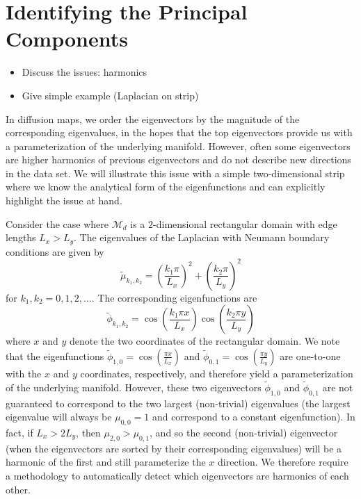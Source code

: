 \documentclass[preprint]{elsarticle}
\begin{document}
\section{Identifying the Principal Components}

\begin{itemize}
\item Discuss the issues: harmonics
\item Give simple example (Laplacian on strip)
\end{itemize}


In diffusion maps, we order the eigenvectors by the magnitude of the corresponding eigenvalues, in the hopes that the top eigenvectors provide us with a parameterization of the underlying manifold.
%
However, often some eigenvectors are higher harmonics of previous eigenvectors and do not describe new directions in the data set. 
%
We will illustrate this issue with a simple two-dimensional strip where we know the analytical form of the eigenfunctions and can explicitly highlight the issue at hand. 

Consider the case where $\mathcal{M}_d$ is a $2$-dimensional rectangular domain with edge lengths $L_x  > L_y$. 
%
The eigenvalues of the Laplacian with Neumann boundary conditions are given by
\begin{equation}
\tilde{\mu}_{k_1, k_2} = \left( \frac{k_1 \pi}{L_x} \right)^2 + \left( \frac{k_2 \pi}{L_y} \right)^2
\end{equation}
for $k_1, k_2 = 0, 1, 2, \dots$.
%
The corresponding eigenfunctions are 
\begin{equation}
\tilde{\phi}_{k_1, k_2} = \cos \left( \frac{k_1 \pi x}{L_x} \right) \cos \left( \frac{k_2 \pi y}{L_y} \right)
\end{equation}
where $x$ and $y$ denote the two coordinates of the rectangular domain. 
%
We note that the eigenfunctions $\tilde{\phi}_{1, 0} = \cos \left( \frac{\pi x}{L_x} \right)$ and $\tilde{\phi}_{0, 1} = \cos \left( \frac{\pi y}{L_y} \right)$ are one-to-one with the $x$ and $y$ coordinates, respectively, and therefore yield a parameterization of the underlying manifold. 
%
However, these two eigenvectors $\tilde{\phi}_{1, 0}$ and $\tilde{\phi}_{0, 1}$ are not guaranteed to correspond to the two largest (non-trivial) eigenvalues (the largest eigenvalue will always be $\mu_{0,0} = 1$ and correspond to a constant eigenfunction). 
%
In fact, if $L_x > 2 L_y$, then $\mu_{2, 0} > \mu_{0, 1}$, and so the second (non-trivial) eigenvector (when the eigenvectors are sorted by their corresponding eigenvalues) will be a harmonic of the first and still parameterize the $x$ direction. 
%
We therefore require a methodology to automatically detect which eigenvectors are harmonics of each other. 
\end{document}
